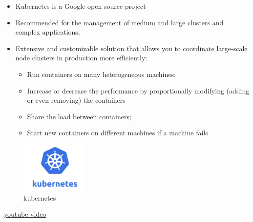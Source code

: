 \documentclass[10pt, oneside]{article}
\begin{document}
\begin{multicols}{2}
    \begin{itemize}
        \item Kubernetes is a Google open source project
        \item Recommended for the management of medium and large clusters
        and complex applications;
        \item Extensive and customizable solution that allows you to coordinate large-scale node clusters in production more efficiently:\begin{itemize}
            \item Run containers on many heterogeneous machines;
            \item Increase or decrease the performance by proportionally
            modifying (adding or even removing) the containers
            \item Share the load between containers;
            \item Start new containers on different machines if a machine fails
        \end{itemize}
    \end{itemize}
    \columnbreak
    \begin{figure}[H]
        \begin{center}
        \includegraphics[width=0.3\textwidth]{img/img45.png}
        \caption{kubernetes}
        \label{fig:kubernetes}
        \end{center}
    \end{figure}
\end{multicols}
\href{https://www.youtube.com/watch?v=2vMEQ5zs1ko}{youtube video}
\end{document}
